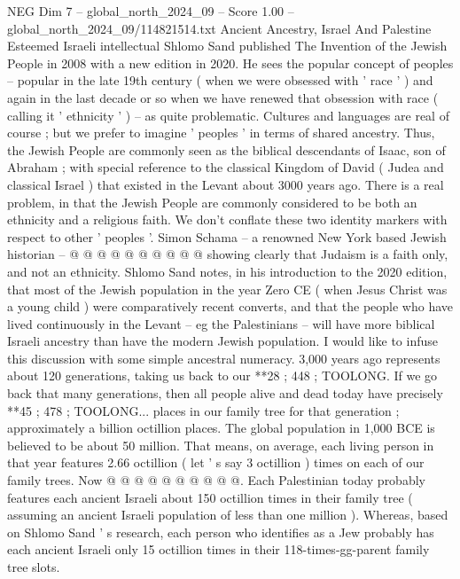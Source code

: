 \begin{textsample}{NEG Dim 7 – global\_north\_2024\_09 – Score 1.00 – global\_north\_2024\_09/114821514.txt}  \label{ex:f7_neg_384}
Ancient Ancestry, Israel And Palestine Esteemed Israeli intellectual Shlomo Sand published The Invention of the Jewish People in 2008 with a new edition in 2020.
He sees the popular concept of peoples -- popular in the late 19th century ( when we were obsessed with ' race ' ) and again in the last decade or so when we have renewed that obsession with race ( calling it ' ethnicity ' ) -- as quite problematic.
Cultures and languages are real of course ; but we prefer to imagine ' peoples ' in terms of shared ancestry.
Thus, the Jewish People are commonly seen as the biblical descendants of Isaac, son of Abraham ; with special reference to the classical Kingdom of David ( Judea and classical Israel ) that existed in the Levant about 3000 years ago.
There is a real problem, in that the Jewish People are commonly considered to be both an ethnicity and a religious faith.
We don't conflate these two identity markers with respect to other ' peoples '.
Simon Schama -- a renowned New York based Jewish historian -- @ @ @ @ @ @ @ @ @ @ showing clearly that Judaism is a faith only, and not an ethnicity.
Shlomo Sand notes, in his introduction to the 2020 edition, that most of the Jewish population in the year Zero CE ( when Jesus Christ was a young child ) were comparatively recent converts, and that the people who have lived continuously in the Levant -- eg the Palestinians -- will have more biblical Israeli ancestry than have the modern Jewish population.
I would like to infuse this discussion with some simple ancestral numeracy. 3,000 years ago represents about 120 generations, taking us back to our **28 ; 448 ; TOOLONG.
If we go back that many generations, then all people alive and dead today have precisely **45 ; 478 ; TOOLONG... places in our family tree for that generation ; approximately a billion octillion places.
The global population in 1,000 BCE is believed to be about 50 million.
That means, on average, each living person in that year features 2.66 octillion ( let ' s say 3 octillion ) times on each of our family trees.
Now @ @ @ @ @ @ @ @ @ @.
Each Palestinian today probably features each ancient Israeli about 150 octillion times in their family tree ( assuming an ancient Israeli population of less than one million ).
Whereas, based on Shlomo Sand ' s research, each person who identifies as a Jew probably has each ancient Israeli only 15 octillion times in their 118-times-gg-parent family tree slots.

\end{textsample}
